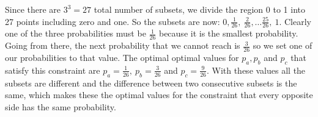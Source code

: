 Since there are $3^3 = 27$ total number of subsets, we divide the region 0 to 1 into 27 points including zero and one. So the subsets are now: $0, \frac{1}{26},\ \frac{2}{26}, \ldots \frac{25}{26},\ 1$. Clearly one of the three probabilities must be $\frac{1}{26}$ because it is the smallest probability. Going from there, the next probability that we cannot reach is $\frac{3}{26}$ so we set one of our probabilities to that value. The optimal optimal values for $p_a, p_b$ and $p_c$ that satisfy this constraint are $p_a = \frac{1}{26},\ p_b = \frac{3}{26}$ and $p_c = \frac{9}{26}$. With these values all the subsets are different and the difference between two consecutive subsets is the same, which makes these the optimal values for the constraint that every opposite side has the same probability.\\

